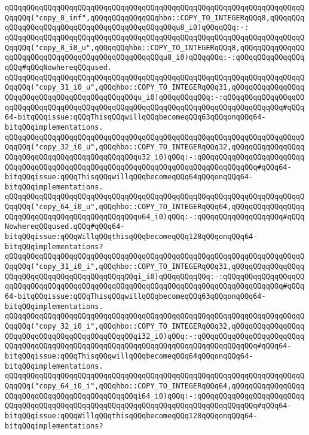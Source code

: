 \verb|qQQqqQQqqQQqqQQqqQQqqQQqqQQqqQQqqQQqqQQqqQQqqQQqqQQqqQQqqQQqqQQqqQQqqQQqqQQq("copy_8_inf",qQQqqQQqqQQqqQQqhbo::COPY_TO_INTEGERqQQq8,qQQqqQQqqQQqqQQqqQQqqQQqqQQqqQQqqQQqqQQqqQQqqQQqu8_i0)qQQqqQQq:-:|\newline
\verb|qQQqqQQqqQQqqQQqqQQqqQQqqQQqqQQqqQQqqQQqqQQqqQQqqQQqqQQqqQQqqQQqqQQqqQQqqQQq("copy_8_i0_u",qQQqqQQqhbo::COPY_TO_INTEGERqQQq8,qQQqqQQqqQQqqQQqqQQqqQQqqQQqqQQqqQQqqQQqqQQqqQQqqQQqu8_i0)qQQqqQQq:-:qQQqqQQqqQQqqQQqqQQq#qQQqNowhereqQQqused.|\newline
\verb|qQQqqQQqqQQqqQQqqQQqqQQqqQQqqQQqqQQqqQQqqQQqqQQqqQQqqQQqqQQqqQQqqQQqqQQqqQQq("copy_31_i0_u",qQQqhbo::COPY_TO_INTEGERqQQq31,qQQqqQQqqQQqqQQqqQQqqQQqqQQqqQQqqQQqqQQqqQQqqQQqu_i0)qQQqqQQqqQQq:-:qQQqqQQqqQQqqQQqqQQqqQQqqQQqqQQqqQQqqQQqqQQqqQQqqQQqqQQqqQQqqQQqqQQqqQQqqQQqqQQqqQQq#qQQq64-bitqQQqissue:qQQqThisqQQqwillqQQqbecomeqQQq63qQQqonqQQq64-bitqQQqimplementations.|\newline
\verb|qQQqqQQqqQQqqQQqqQQqqQQqqQQqqQQqqQQqqQQqqQQqqQQqqQQqqQQqqQQqqQQqqQQqqQQqqQQq("copy_32_i0_u",qQQqhbo::COPY_TO_INTEGERqQQq32,qQQqqQQqqQQqqQQqqQQqqQQqqQQqqQQqqQQqqQQqqQQqqQQqu32_i0)qQQq:-:qQQqqQQqqQQqqQQqqQQqqQQqqQQqqQQqqQQqqQQqqQQqqQQqqQQqqQQqqQQqqQQqqQQqqQQqqQQqqQQqqQQq#qQQq64-bitqQQqissue:qQQqThisqQQqwillqQQqbecomeqQQq64qQQqonqQQq64-bitqQQqimplementations.|\newline
\verb|qQQqqQQqqQQqqQQqqQQqqQQqqQQqqQQqqQQqqQQqqQQqqQQqqQQqqQQqqQQqqQQqqQQqqQQqqQQq("copy_64_i0_u",qQQqhbo::COPY_TO_INTEGERqQQq64,qQQqqQQqqQQqqQQqqQQqqQQqqQQqqQQqqQQqqQQqqQQqqQQqu64_i0)qQQq:-:qQQqqQQqqQQqqQQqqQQq#qQQqNowhereqQQqused.qQQq#qQQq64-bitqQQqissue:qQQqWillqQQqthisqQQqbecomeqQQq128qQQqonqQQq64-bitqQQqimplementations?|\newline
\verb|qQQqqQQqqQQqqQQqqQQqqQQqqQQqqQQqqQQqqQQqqQQqqQQqqQQqqQQqqQQqqQQqqQQqqQQqqQQq("copy_31_i0_i",qQQqhbo::COPY_TO_INTEGERqQQq31,qQQqqQQqqQQqqQQqqQQqqQQqqQQqqQQqqQQqqQQqqQQqqQQqi_i0)qQQqqQQqqQQq:-:qQQqqQQqqQQqqQQqqQQqqQQqqQQqqQQqqQQqqQQqqQQqqQQqqQQqqQQqqQQqqQQqqQQqqQQqqQQqqQQqqQQq#qQQq64-bitqQQqissue:qQQqThisqQQqwillqQQqbecomeqQQq63qQQqonqQQq64-bitqQQqimplementations.|\newline
\verb|qQQqqQQqqQQqqQQqqQQqqQQqqQQqqQQqqQQqqQQqqQQqqQQqqQQqqQQqqQQqqQQqqQQqqQQqqQQq("copy_32_i0_i",qQQqhbo::COPY_TO_INTEGERqQQq32,qQQqqQQqqQQqqQQqqQQqqQQqqQQqqQQqqQQqqQQqqQQqqQQqi32_i0)qQQq:-:qQQqqQQqqQQqqQQqqQQqqQQqqQQqqQQqqQQqqQQqqQQqqQQqqQQqqQQqqQQqqQQqqQQqqQQqqQQqqQQqqQQq#qQQq64-bitqQQqissue:qQQqThisqQQqwillqQQqbecomeqQQq64qQQqonqQQq64-bitqQQqimplementations.|\newline
\verb|qQQqqQQqqQQqqQQqqQQqqQQqqQQqqQQqqQQqqQQqqQQqqQQqqQQqqQQqqQQqqQQqqQQqqQQqqQQq("copy_64_i0_i",qQQqhbo::COPY_TO_INTEGERqQQq64,qQQqqQQqqQQqqQQqqQQqqQQqqQQqqQQqqQQqqQQqqQQqqQQqi64_i0)qQQq:-:qQQqqQQqqQQqqQQqqQQqqQQqqQQqqQQqqQQqqQQqqQQqqQQqqQQqqQQqqQQqqQQqqQQqqQQqqQQqqQQqqQQq#qQQq64-bitqQQqissue:qQQqWillqQQqthisqQQqbecomeqQQq128qQQqonqQQq64-bitqQQqimplementations?|\newline

